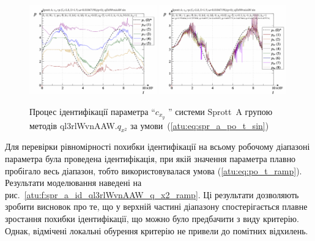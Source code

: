 \begin{figure}[htb!]
  \centerline{
    \includegraphics[width=0.49\textwidth]{p/cha/spr_a/ql3rlWvnAAW_x2/sprott_a_id-p_t_pi_ql3rlWvnAAW_sin.png}
    \hfill
    \includegraphics[width=0.49\textwidth]{p/cha/spr_a/ql3rlWvnAAW_x2/sprott_a_id-p_t_p_ql3rlWvnAAW_sin.png}
  }
\caption{Процес ідентифікації параметра ``$ c_{x_y} $ '' системи Sprott~A групою методів ql3rlWvnAAW.$q_{x^2} $ за умови~(\ref{atu:eq:spr_a_po_t_sin})}
  \label{atu:f:spr_a_id_ql3rlWvnAAW_q_x2_sin}
\end{figure}

Для перевірки рівномірності похибки ідентифікації на всьому
робочому діапазоні параметра була проведена ідентифікація,
при якій значення параметра плавно пробігало весь діапазон,
тобто використовувалася умова (\ref{atu:eq:po_t_ramp}). Результати
моделювання наведені на рис.~\ref{atu:f:spr_a_id_ql3rlWvnAAW_q_x2_ramp}. Ці
результати дозволяють зробити висновок про те, що у верхній
частині діапазону спостерігається плавне зростання похибки
ідентифікації, що можно було предбачити з виду критерію. Однак, відмічені
локальні обурення критерію не привели до помітних відхилень.


